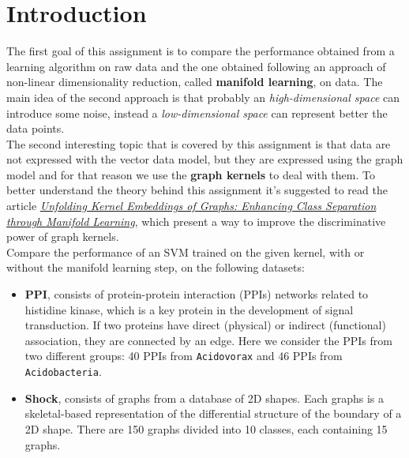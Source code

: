 \documentclass[11pt,a4paper]{article}
\begin{document}

\newcommand{\titolo}  {Assignment 3}
\newcommand{\nome}    {Manifold Learning and Graph Kernels}
\newcommand{\versione}{2.0}





\section {Introduction}
The first goal of this assignment is to compare the performance obtained from a learning algorithm on raw data and the one obtained following an approach of non-linear dimensionality reduction, called \textbf{manifold learning}, on data. The main idea of the second approach is that probably an \textit{high-dimensional space} can introduce some noise, instead a \textit{low-dimensional space} can represent better the data points. \\
The second interesting topic that is covered by this assignment is that data are not expressed with the vector data model, but they are expressed using the graph model and for that reason we use the \textbf{graph kernels} to deal with them. To better understand the theory behind this assignment it's suggested to read the article \href{http://www.dsi.unive.it/~atorsell/AI/graph/Unfolding.pdf}{\textit{Unfolding Kernel Embeddings of Graphs: Enhancing Class Separation through Manifold Learning}}, which present a way to improve the discriminative power of graph kernels. \\


Compare the performance of an SVM trained on the given kernel, with or without the manifold learning step, on the following datasets: \\
\begin{itemize}
	\item \textbf{PPI}, consists of protein-protein interaction (PPIs) networks related to histidine kinase, which is a key protein in the development of signal transduction. If two proteins have direct (physical) or indirect (functional) association, they are connected by an edge. Here we consider the PPIs from two different groups: 40 PPIs from \verb|Acidovorax| and 46 PPIs from \verb|Acidobacteria|.\\
	
	\item \textbf{Shock}, consists of graphs from a database of 2D shapes. Each graphs is a skeletal-based representation of the differential structure of the boundary of a 2D shape. There are 150 graphs divided into 10 classes, each containing 15 graphs.\\
\end{itemize}
\end{document}

